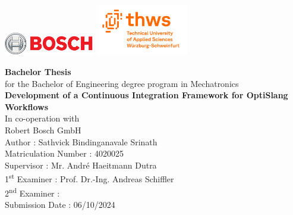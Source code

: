 \begin{titlepage}
    \par
    \includegraphics[width=0.3\textwidth, valign=M]{Logo/bosch_logo.png}
    \hfill
    \includegraphics[width=0.3\textwidth,valign=M]{Logo/Thws-logo_English.png}
    \par
    \vspace{3cm}
    \begin{center}
         \textbf{\Huge Bachelor Thesis}
         \vspace{5pt}
         \\
         for the Bachelor of Engineering degree program in Mechatronics
         \vspace{2.5cm}
         \\
         \textbf{\Huge Development of a Continuous Integration Framework for OptiSlang Workflows}
         \vspace{2cm}
         \\
         In co-operation with
         \vspace{5pt}
         \\
         Robert Bosch GmbH
         \vspace{2cm}
         \\
         Author : Sathvick Bindinganavale Srinath\\
         Matriculation Number : 4020025
         \vspace{1cm}\\
         Supervisor : Mr. André Haeitmann Dutra \\
         1\textsuperscript{st} Examiner : Prof. Dr.-Ing. Andreas Schiffler\\
         2\textsuperscript{nd} Examiner :
         \vspace{1cm} \\
         Submission Date : 06/10/2024
    \end{center}
\end{titlepage}